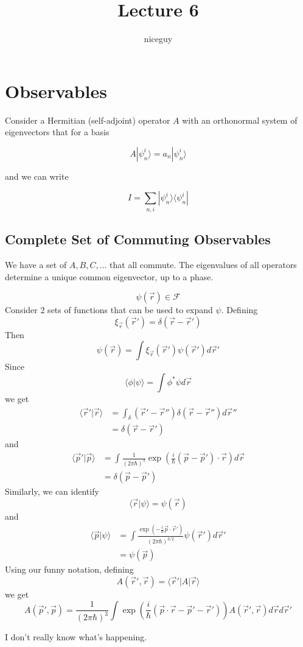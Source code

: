 \documentclass[12pt]{article}
\title{Lecture 6}
\author{niceguy}
\begin{document}
\maketitle

\section{Observables}

Consider a Hermitian (self-adjoint) operator $A$ with an orthonormal system of eigenvectors that for a basis

$$A|\psi_n^i\rangle = a_n|\psi_n^i\rangle$$

and we can write

$$I = \sum_{n,i} |\psi_n^i\rangle\langle\psi_n^i|$$

\subsection{Complete Set of Commuting Observables}

We have a set of $A,B,C,\dots$ that all commute. The eigenvalues of all operators determine a unique common eigenvector, up to a phase.

\begin{ex}

    $$\psi(\vec r) \in \mathcal F$$
    Consider 2 sets of functions that can be used to expand $\psi$. Defining
    $$\xi_{\vec r}(\vec r') = \delta(\vec r - \vec r')$$
    Then
    $$\psi(\vec r) = \int \xi_{\vec r}(\vec r')\psi(\vec r')d\vec r'$$
    Since
    $$\langle \phi|\psi \rangle = \int \phi^*\psi d\vec r$$
    we get
    \begin{align*}
        \langle \vec r'|\vec r \rangle &= \int_\delta(\vec r' - \vec r'')\delta(\vec r - \vec r'') d\vec r'' \\
                                       &= \delta(\vec r - \vec r')
    \end{align*}
    and
    \begin{align*}
        \langle \vec p' | \vec p \rangle &= \int \frac{1}{\left(2\pi\hbar\right)^3} \exp\left(\frac{i}{\hbar} (\vec p - \vec p ')\cdot \vec r\right) d\vec r \\
        &= \delta(\vec p - \vec p')
    \end{align*}
    Similarly, we can identify
    $$\langle \vec r | \psi \rangle = \psi(\vec r)$$
    and
    \begin{align*}
        \langle \vec p | \psi \rangle &= \int \frac{\exp\left(-\frac{i}{\hbar}\vec p \cdot \vec r'\right)}{(2\pi\hbar)^{3/2}} \psi(\vec r')d\vec r' \\
                                      &= \psi(\vec p)
    \end{align*}
    Using our funny notation, defining
    $$A(\vec r',\vec r) = \langle \vec r' |A| \vec r \rangle$$
    we get
    $$A(\vec p',\vec p) = \frac{1}{(2\pi\hbar)^3} \int \exp\left(\frac{i}{\hbar} (\vec p \cdot \vec r - \vec p' - \vec r')\right) A(\vec r',\vec r) d\vec r d\vec r'$$
\end{ex}

I don't really know what's happening.
\end{document}
